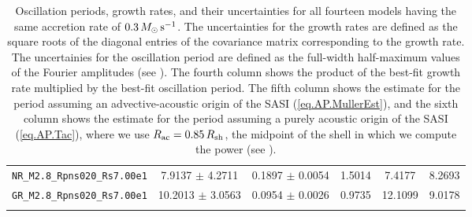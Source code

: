 \begin{table}[b]
\begin{tabularx}{0.75\textwidth}{cccccc}
    \texttt{NR\_M2.8\_Rpns020\_Rs7.00e1} & 7.9137 $\pm$ 4.2711 & 0.1897 $\pm$ 0.0054 & 1.5014 & 7.4177 & 8.2693 \\
    \texttt{GR\_M2.8\_Rpns020\_Rs7.00e1} & 10.2013 $\pm$ 3.0563 & 0.0954 $\pm$ 0.0026 & 0.9735 & 12.1099 & 9.0178 \\
    \bottomrule \\
  \end{tabularx}
  \caption{
Oscillation periods, growth rates, and their uncertainties for all
fourteen models having the same accretion rate of $0.3\,M_{\odot}\,\mathrm{s}^{-1}$.
The uncertainties for the growth rates are defined as the square roots of the
diagonal entries of the covariance matrix corresponding to the growth rate.
The uncertainies for the oscillation period are defined as the full-width
half-maximum values of the Fourier amplitudes (see ).
The fourth column shows the product of the best-fit growth rate multiplied
by the best-fit oscillation period.
The fifth column shows the estimate for the period assuming an
advective-acoustic origin of the SASI (\eqref{eq.AP.MullerEst}),
and the sixth column shows the estimate for the period assuming
a purely acoustic origin of the SASI (\eqref{eq.AP.Tac}), where we use
$R_{\mathrm{ac}}=0.85\,R_{\mathrm{sh}}$, the midpoint
of the shell in which we compute the power (see ).}
  \label{tab.results}
\end{table}
